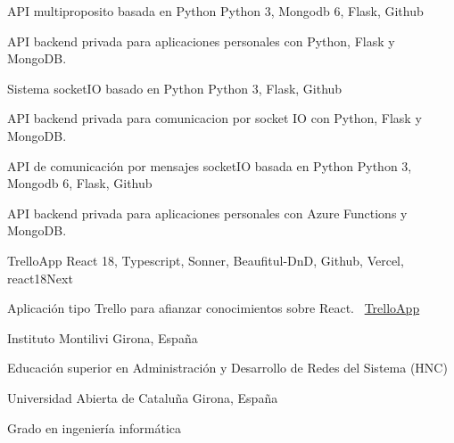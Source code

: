 \documentclass[]{awesome-cv}
\begin{document}
\begin{cventries}
    \cventry
    {}
    {API multiproposito basada en Python}
    {Python 3, Mongodb 6, Flask, Github}
    {}
    {\begin{cvitems}
        \item {API backend privada para aplicaciones personales con Python, Flask y MongoDB.}
    \end{cvitems}}

    \cventry
    {}
    {Sistema socketIO basado en Python}
    {Python 3, Flask, Github}
    {}
    {\begin{cvitems}
        \item {API backend privada para comunicacion por socket IO con Python, Flask y MongoDB.}
    \end{cvitems}}
    
    \cventry
    {}
    {API de comunicación por mensajes socketIO basada en Python}
    {Python 3, Mongodb 6, Flask, Github}
    {}
    {\begin{cvitems}
        \item {API backend privada para aplicaciones personales con Azure Functions y MongoDB.}
    \end{cvitems}}

    \cventry
    {}
    {TrelloApp}
    {React 18, Typescript, Sonner, Beaufitul-DnD, Github, Vercel, react18Next}
    {}
    {\begin{cvitems}
        \item {Aplicación tipo Trello para afianzar conocimientos sobre React.
        \newline \faLink\ \href{https://trello-app-giacconidev.vercel.app/user/login}{TrelloApp}}
    \end{cvitems}}
\end{cventries}

\begin{cventries}
    \cventry
    {}
    {Instituto Montilivi}
    {Girona, España}
    {}
    {\begin{cvitems}
        \item {Educación superior en Administración y Desarrollo de Redes del Sistema (HNC)}
    \end{cvitems}}

    \cventry
    {}
    {Universidad Abierta de Cataluña}
    {Girona, España}
    {}
    {\begin{cvitems}
        \item {Grado en ingeniería informática}
    \end{cvitems}}
\end{cventries}
\end{document}
